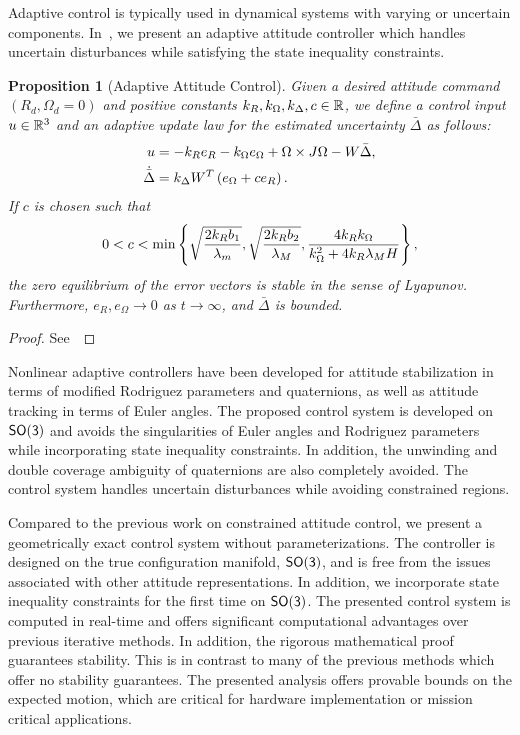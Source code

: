 \documentclass[10pt,fleqn]{IJCAS}  %
\newtheorem{prop}{Proposition}
\begin{document}
\begin{multicols}{2}
Adaptive control is typically used in dynamical systems with varying or uncertain components.
In~, we present an adaptive attitude controller which handles uncertain disturbances while satisfying the state inequality constraints.

\begin{prop}[Adaptive Attitude Control]\label{prop:adaptive_control}
Given  a desired attitude command \( (R_d, \Omega_d = 0 )\) and positive constants \( k_R, k_\Omega, k_\Delta, c \in \mathbb{R} \), we define a control input \( u \in \mathbb{R}^3\) and an adaptive update law for the estimated uncertainty \( \bar{\Delta} \) as follows:
\begin{align}
	u &= - k_R e_R - k_\Omega e_\Omega + \Omega \times J \Omega - W \bar{\Delta} , \label{eqn:adaptive_control} \\
	\dot{\bar{\Delta}} &= k_\Delta W^T \left( e_\Omega + c e_R \right) . \label{eqn:delta_dot}
\end{align}
If \( c \) is chosen such that
\begin{gather}
	0 < c < \min \left\{ \sqrt{\frac{2 k_R b_1}{\lambda_m}},\sqrt{\frac{2 k_R b_2}{\lambda_M}}, \frac{4 k_R k_\Omega}{k_\Omega^2 + 4 k_R \lambda_M H} \right\} , \label{eqn:c_bound}
\end{gather}
  the zero equilibrium of the error vectors is stable in the sense of Lyapunov. Furthermore, $e_R,e_\Omega\rightarrow 0$ as $t\rightarrow\infty$, and $\bar\Delta$ is  bounded.
\end{prop}
\begin{proof}
See~
\end{proof}

Nonlinear adaptive controllers have been developed for attitude stabilization in terms of modified Rodriguez parameters and quaternions, as well as attitude tracking in terms of Euler angles. 
The proposed control system is developed on \(\mathsf{SO(3)}\) and avoids the singularities of Euler angles and Rodriguez parameters while incorporating state inequality constraints. 
In addition, the unwinding and double coverage ambiguity of quaternions are also completely avoided. 
The control system handles uncertain disturbances while avoiding constrained regions.

Compared to the previous work on constrained attitude control, we present a geometrically exact control system without parameterizations.
The controller is designed on the true configuration manifold, \( \mathsf{SO(3)} \), and is free from the issues associated with other attitude representations.
In addition, we incorporate state inequality constraints for the first time on \( \mathsf{SO(3)} \).
The presented control system is computed in real-time and offers significant computational advantages over previous iterative methods. 
In addition, the rigorous mathematical proof guarantees stability.
This is in contrast to many of the previous methods which offer no stability guarantees.
The presented analysis offers provable bounds on the expected motion, which are critical for hardware implementation or mission critical applications.

\end{multicols}
\end{document}
